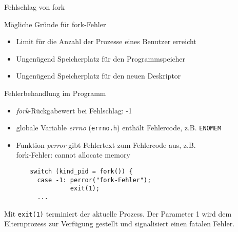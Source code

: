 \documentclass[utf8,9pt]{beamer}
\newenvironment{blue}{\color{blue}}{}
\begin{document}
\begin{frame}[fragile]{Fehlschlag von fork}{}

\begin{block}{Mögliche Gründe für fork-Fehler}
\begin{itemize}
\item Limit für die Anzahl der Prozesse eines Benutzer erreicht
\item Ungenügend Speicherplatz für den Programmspeicher
\item Ungenügend Speicherplatz für den neuen Deskriptor
\end{itemize}
\end{block}

\begin{block}{Fehlerbehandlung im Programm}
\begin{itemize}
\item {\em fork\/}-Rückgabewert bei Fehlschlag: -1
\item globale Variable {\em errno\/} ({\tt errno.h}) enthält Fehlercode, z.B.
   {\tt ENOMEM} 
\item Funktion {\em perror\/} gibt Fehlertext zum Fehlercode aus, z.B.\\
  fork-Fehler: cannot allocate memory
\end{itemize}

    \footnotesize
\begin{verbatim}
       switch (kind_pid = fork()) {
         case -1: perror("fork-Fehler");
                  exit(1);
         ...
\end{verbatim}

\begin{blue}
Mit {\tt exit(1)} terminiert der aktuelle Prozess. Der Parameter 1 wird dem Elternprozess zur
Verfügung gestellt und signalisiert  einen fatalen Fehler.
\end{blue}

\end{block}

\end{frame}
\end{document}
